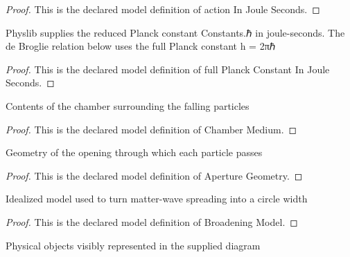 \begin{proof}
  This is the declared model definition of action In Joule Seconds.
\end{proof}
\begin{definition}
  \label{def:physics:phyx-mini-0507:phyxminiproblems-problemphyxmini0507-fullplanckconstantinjouleseconds}
  Physlib supplies the reduced Planck constant Constants.ℏ in joule-seconds. The de Broglie relation below uses the full Planck constant h = 2πℏ
\end{definition}
\begin{proof}
  This is the declared model definition of full Planck Constant In Joule Seconds.
\end{proof}
\begin{definition}
  \label{def:physics:phyx-mini-0507:phyxminiproblems-problemphyxmini0507-chambermedium}
  Contents of the chamber surrounding the falling particles
\end{definition}
\begin{proof}
  This is the declared model definition of Chamber Medium.
\end{proof}
\begin{definition}
  \label{def:physics:phyx-mini-0507:phyxminiproblems-problemphyxmini0507-aperturegeometry}
  Geometry of the opening through which each particle passes
\end{definition}
\begin{proof}
  This is the declared model definition of Aperture Geometry.
\end{proof}
\begin{definition}
  \label{def:physics:phyx-mini-0507:phyxminiproblems-problemphyxmini0507-broadeningmodel}
  Idealized model used to turn matter-wave spreading into a circle width
\end{definition}
\begin{proof}
  This is the declared model definition of Broadening Model.
\end{proof}
\begin{definition}
  \label{def:physics:phyx-mini-0507:phyxminiproblems-problemphyxmini0507-figureobject}
  Physical objects visibly represented in the supplied diagram
\end{definition}
